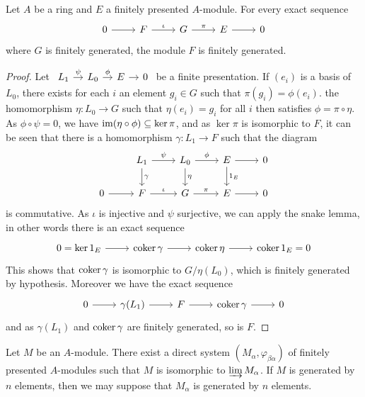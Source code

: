 \begin{proposition}\label{module ft exact sequence kernel finite}
Let $A$ be a ring and $E$ a finitely presented $A$-module. For every exact sequence
\[\begin{tikzcd}
0\ar[r]&F\ar[r,"\iota"]&G\ar[r,"\pi"]&E\ar[r]&0
\end{tikzcd}\]
where $G$ is finitely generated, the module $F$ is finitely generated.
\end{proposition}
\begin{proof}
Let $\begin{tikzcd}[column sep=10pt]L_1\ar[r,"\psi"]&L_0\ar[r,"\phi"]&E\ar[r]&0 \end{tikzcd}$ be a finite presentation. If $(e_i)$ is a basis of $L_0$, there exists for each $i$ an element $g_i\in G$ such that $\pi(g_i)=\phi(e_i)$. the homomorphism $\eta:L_0\to G$ such that $\eta(e_i)=g_i$ for all $i$ then satisfies $\phi=\pi\circ\eta$. As $\phi\circ\psi=0$, we have $\operatorname{im}(\eta\circ\phi)\subseteq\operatorname{ker}\pi$, and as $\ker\pi$ is isomorphic to $F$, it can be seen that there is a homomorphism $\gamma:L_1\to F$ such that the diagram
\[\begin{tikzcd}
&L_1\ar[r,"\psi"]\ar[d,"\gamma"]&L_0\ar[r,"\phi"]\ar[d,"\eta"]&E\ar[r]\ar[d,"1_E"]&0\\
0\ar[r]&F\ar[r,"\iota"]&G\ar[r,"\pi"]&E\ar[r]&0
\end{tikzcd}\]
is commutative. As $\iota$ is injective and $\psi$ surjective, we can apply the snake lemma, in other words there is an exact sequence
\[\begin{tikzcd}
0=\ker 1_E\ar[r]&\coker\gamma\ar[r]&\coker\eta\ar[r]&\coker 1_E=0
\end{tikzcd}\]
This shows that $\operatorname{coker}\gamma$ is isomorphic to $G/\eta(L_0)$, which is finitely generated by hypothesis. Moreover we have the exact sequence
\[\begin{tikzcd}
0\ar[r]&\gamma(L_1)\ar[r]&F\ar[r]&\coker\gamma\ar[r]&0
\end{tikzcd}\]
and as $\gamma(L_1)$ and $\operatorname{coker}\gamma$ are finitely generated, so is $F$.
\end{proof}
\begin{proposition}\label{module is direct limit of finitely presented}
Let $M$ be an $A$-module. There exist a direct system $(M_\alpha,\varphi_{\beta\alpha})$ of finitely presented $A$-modules such that $M$ is isomorphic to $\varinjlim M_\alpha$. If $M$ is generated by $n$ elements, then we may suppose that $M_\alpha$ is generated by $n$ elements.
\end{proposition}
